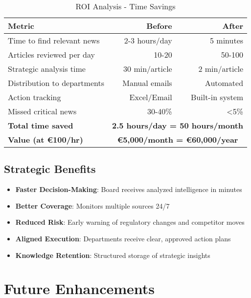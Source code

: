 \documentclass[11pt,a4paper]{article}
\begin{document}
\begin{table}[h]
\centering
\begin{tabular}{@{}lrr@{}}
\toprule
\textbf{Metric} & \textbf{Before} & \textbf{After} \\ \midrule
Time to find relevant news & 2-3 hours/day & 5 minutes \\
Articles reviewed per day & 10-20 & 50-100 \\
Strategic analysis time & 30 min/article & 2 min/article \\
Distribution to departments & Manual emails & Automated \\
Action tracking & Excel/Email & Built-in system \\
Missed critical news & 30-40\% & <5\% \\
\midrule
\textbf{Total time saved} & \multicolumn{2}{c}{\textbf{2.5 hours/day = 50 hours/month}} \\
\textbf{Value (at \euro 100/hr)} & \multicolumn{2}{c}{\textbf{\euro 5,000/month = \euro 60,000/year}} \\
\bottomrule
\end{tabular}
\caption{ROI Analysis - Time Savings}
\end{table}

\subsection{Strategic Benefits}
\begin{itemize}[leftmargin=*]
    \item \textbf{Faster Decision-Making}: Board receives analyzed intelligence in minutes
    \item \textbf{Better Coverage}: Monitors multiple sources 24/7
    \item \textbf{Reduced Risk}: Early warning of regulatory changes and competitor moves
    \item \textbf{Aligned Execution}: Departments receive clear, approved action plans
    \item \textbf{Knowledge Retention}: Structured storage of strategic insights
\end{itemize}

\section{Future Enhancements}
\end{document}

